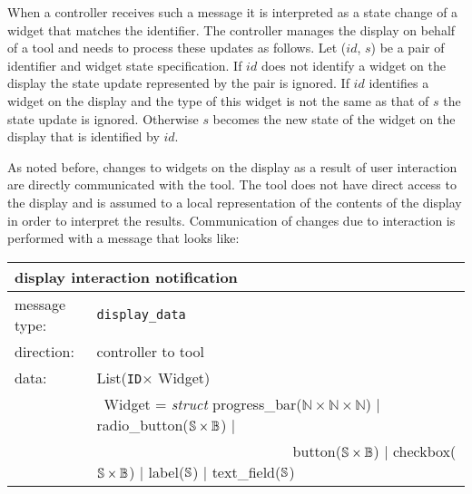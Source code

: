 \documentclass{article}
\newcommand{\msg}[1]{\texttt{#1}}
\newcommand{\String}{\ensuremath \mathbb{S}\xspace}
\newcommand{\Id}{\texttt{ID}\xspace}
\begin{document}
   \noindent When a controller receives such a message it is interpreted as a
   state change of a widget that matches the identifier. The controller manages
   the display on behalf of a tool and needs to process these updates as
   follows.  Let ($id$, $s$) be a pair of identifier and widget state
   specification. If $id$ does not identify a widget on the display the state
   update represented by the pair is ignored. If $id$ identifies a
   widget on the display and the type of this widget is not the same as that of
   $s$ the state update is ignored.  Otherwise $s$ becomes the new state of the
   widget on the display that is identified by $id$.
   
   \pagebreak

   As noted before, changes to widgets on the display as a result of user
   interaction are directly communicated with the tool. The tool does not have
   direct access to the display and is assumed to a local representation of the
   contents of the display in order to interpret the results. Communication of
   changes due to interaction is performed with a message that looks like:

   \begin{table}[H]
    \begin{center}
     \begin{tabular}{|ll|}
      \hline
       \multicolumn{2}{|l|}{\textbf{display interaction notification}} \\
      \hline
       message type:   & \msg{display\_data} \\
      \hline
       direction:      & controller to tool \\
      \hline
       data:           & List(\Id $\times$ Widget) \\
                       & \ Widget = \textit{struct} progress\_bar($\mathbb{N} \times \mathbb{N} \times \mathbb{N}$) $|$
                                                    radio\_button($\String \times \mathbb{B}$) $|$ \\
                       & \ \ \ \ \ \ \ \ \ \ \ \ \ \ \ \ \ \ \ \ \ \ \ \ \ \ \
                                                    button($\String \times \mathbb{B}$) $|$
                                                    checkbox($\String \times \mathbb{B}$) $|$
                                                    label($\String$) $|$
                                                    text\_field($\String$) \\
      \hline
     \end{tabular}
    \end{center}
   \vspace{-0.0cm}
   \end{table}
\end{document}
